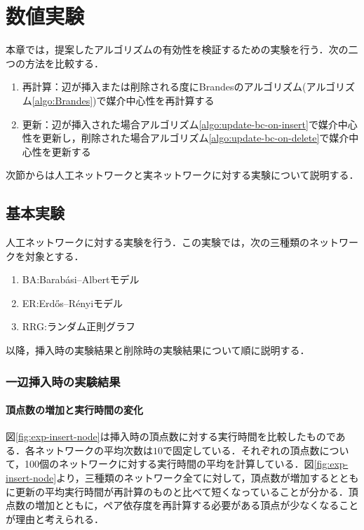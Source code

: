 \chapter{数値実験}

本章では，提案したアルゴリズムの有効性を検証するための実験を行う．次の二つの方法を比較する．
\begin{enumerate}
\item 再計算：辺が挿入または削除される度にBrandesのアルゴリズム(アルゴリズム\ref{algo:Brandes})で媒介中心性を再計算する
\item 更新：辺が挿入された場合アルゴリズム\ref{algo:update-bc-on-insert}で媒介中心性を更新し，削除された場合アルゴリズム\ref{algo:update-bc-on-delete}で媒介中心性を更新する
\end{enumerate}
次節からは人工ネットワークと実ネットワークに対する実験について説明する．

\section{基本実験}

人工ネットワークに対する実験を行う．この実験では，次の三種類のネットワークを対象とする．
\begin{enumerate}
\item BA:Barab\'{a}si--Albertモデル
\item ER:Erd\H{o}s--R\'{e}nyiモデル
\item RRG:ランダム正則グラフ
\end{enumerate}

以降，挿入時の実験結果と削除時の実験結果について順に説明する．

\subsection{一辺挿入時の実験結果}

\subsubsection{頂点数の増加と実行時間の変化}
図\ref{fig:exp-insert-node}は挿入時の頂点数に対する実行時間を比較したものである．各ネットワークの平均次数は$10$で固定している．それぞれの頂点数について，100個のネットワークに対する実行時間の平均を計算している．図\ref{fig:exp-insert-node}より，三種類のネットワーク全てに対して，頂点数が増加するとともに更新の平均実行時間が再計算のものと比べて短くなっていることが分かる．頂点数の増加とともに，ペア依存度を再計算する必要がある頂点が少なくなることが理由と考えられる．


